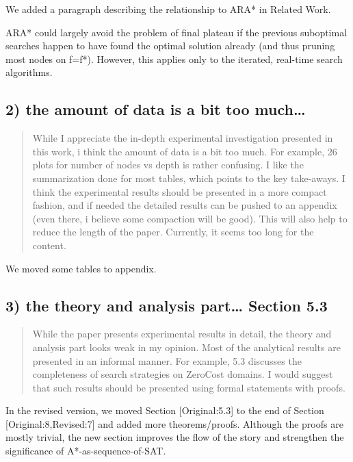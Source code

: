 \documentclass{article}
\begin{document}
We added a paragraph describing the relationship to ARA* in Related Work.

ARA* could largely avoid the problem of final plateau if the previous suboptimal searches happen to
have found the optimal solution already (and thus pruning most nodes on f=f*). However, this applies only to the iterated, real-time
search algorithms.

\subsection{2) the amount of data is a bit too much\ldots{}}
\label{sec:orgheadline15}

\begin{quote}
 While I appreciate the in-depth experimental investigation
presented in this work, i think the amount of data is a bit too much.
For example, 26 plots for number of nodes vs depth is rather
confusing. I like the summarization done for most tables, which points
to the key take-aways. I think the experimental results should be
presented in a more compact fashion, and if needed the detailed
results can be pushed to an appendix (even there, i believe some
compaction will be good). This will also help to reduce the length of
the paper. Currently, it seems too long for the content.
\end{quote}

We moved some tables to appendix.

\subsection{\label{orgtarget1} 3) the theory and analysis part\ldots{} Section 5.3}
\label{sec:orgheadline16}

\begin{quote}
 While the paper presents experimental results in detail, the theory
and analysis part looks weak in my opinion. Most of the analytical
results are presented in an informal manner. For example, 5.3
discusses the completeness of search strategies on ZeroCost domains. I
would suggest that such results should be presented using formal
statements with proofs.
\end{quote}

In the revised version, we moved Section [Original:5.3]
to the end of Section [Original:8,Revised:7] and added more theorems/proofs.
Although the proofs are mostly trivial, the new section improves the flow of the story
and strengthen the significance of A*-as-sequence-of-SAT.
\end{document}
